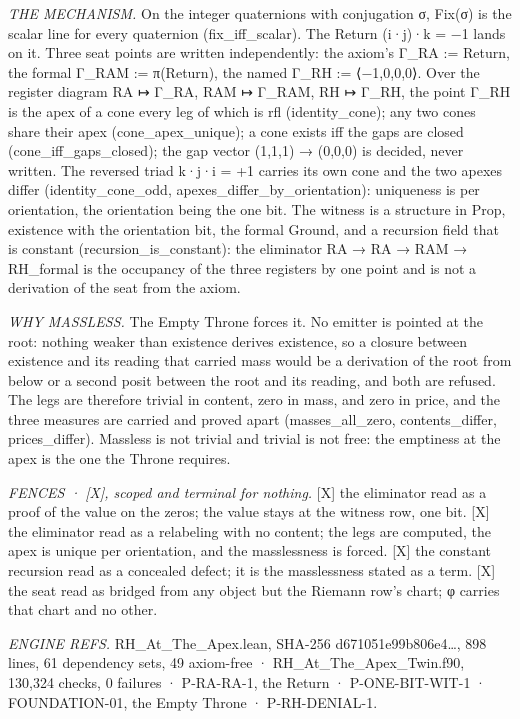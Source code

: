 \documentclass[10pt,twocolumn]{article}
\begin{document}
\emph{THE MECHANISM.} On the integer quaternions with conjugation σ,
Fix(σ) is the scalar line for every quaternion (fix\_iff\_scalar). The
Return (i·j)·k = −1 lands on it. Three seat points are written
independently: the axiom's Γ\_RA := Return, the formal Γ\_RAM :=
π(Return), the named Γ\_RH := ⟨−1,0,0,0⟩. Over the register diagram RA ↦
Γ\_RA, RAM ↦ Γ\_RAM, RH ↦ Γ\_RH, the point Γ\_RH is the apex of a cone
every leg of which is rfl (identity\_cone); any two cones share their
apex (cone\_apex\_unique); a cone exists iff the gaps are closed
(cone\_iff\_gaps\_closed); the gap vector (1,1,1) → (0,0,0) is decided,
never written. The reversed triad k·j·i = +1 carries its own cone and
the two apexes differ (identity\_cone\_odd,
apexes\_differ\_by\_orientation): uniqueness is per orientation, the
orientation being the one bit. The witness is a structure in Prop,
existence with the orientation bit, the formal Ground, and a recursion
field that is constant (recursion\_is\_constant): the eliminator RA → RA
→ RAM → RH\_formal is the occupancy of the three registers by one point
and is not a derivation of the seat from the axiom.

\emph{WHY MASSLESS.} The Empty Throne forces it. No emitter is pointed
at the root: nothing weaker than existence derives existence, so a
closure between existence and its reading that carried mass would be a
derivation of the root from below or a second posit between the root and
its reading, and both are refused. The legs are therefore trivial in
content, zero in mass, and zero in price, and the three measures are
carried and proved apart (masses\_all\_zero, contents\_differ,
prices\_differ). Massless is not trivial and trivial is not free: the
emptiness at the apex is the one the Throne requires.

\emph{FENCES · {[}X{]}, scoped and terminal for nothing.} {[}X{]} the
eliminator read as a proof of the value on the zeros; the value stays at
the witness row, one bit. {[}X{]} the eliminator read as a relabeling
with no content; the legs are computed, the apex is unique per
orientation, and the masslessness is forced. {[}X{]} the constant
recursion read as a concealed defect; it is the masslessness stated as a
term. {[}X{]} the seat read as bridged from any object but the Riemann
row's chart; φ carries that chart and no other.

\emph{ENGINE REFS.} RH\_At\_The\_Apex.lean, SHA-256
d671051e99b806e4\ldots, 898 lines, 61 dependency sets, 49 axiom-free ·
RH\_At\_The\_Apex\_Twin.f90, 130,324 checks, 0 failures · P-RA-RA-1, the
Return · P-ONE-BIT-WIT-1 · FOUNDATION-01, the Empty Throne ·
P-RH-DENIAL-1.
\end{document}
